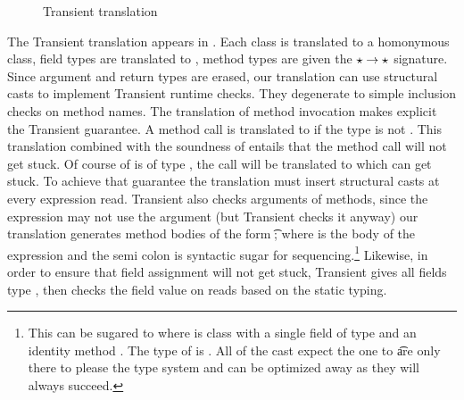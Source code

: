 \documentclass{tex/llncs}
\begin{document}
\begin{figure}[!t]
\medskip

\hrulefill

\caption{Transient translation}\label{tptr}
\end{figure}

The Transient translation appears in . Each class is translated
to a homonymous \kafka class, field types are translated to \any, method
types are given the $\star \to \star$ signature. Since argument and return
types are erased, our translation can use structural casts to implement
Transient runtime checks. They degenerate to simple inclusion checks on
method names.  The translation of method invocation makes explicit the
Transient guarantee.  A method call \Call\e\m\ep is translated to
\KCall\e\m\ep\any\any if the type \e is not \any. This translation combined
with the soundness of \kafka entails that the method call will not get
stuck.  Of course of \e is of type \any, the call will be translated to
\DynCall\e\m\ep which can get stuck.  To achieve that guarantee the
translation must insert structural casts at every expression read. Transient
also checks arguments of methods, since the expression may not use the
argument (but Transient checks it anyway) our translation generates method
bodies of the form \SubCast\t\x; \e where \e is the body of the expression
and the semi colon is syntactic sugar for sequencing.\footnote{This can be
  sugared to
  \SubCast\tp{\KCall{\New\A{\SubCast\any{\SubCast\t\x}}}\m{\SubCast\any\e}\any\any}
  where \A is class with a single field of type \any and an identity method
  \m. The type of \e is \tp. All of the cast expect the one to \t are only
  there to please the type system and can be optimized away as they will
  always succeed. } Likewise, in order to ensure that field assignment will
not get stuck, Transient gives all fields type \any, then checks the field
value on reads based on the static typing.
\end{document}
